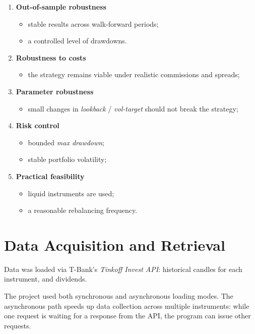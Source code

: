 \documentclass[12pt]{article}
\begin{document}
\begin{enumerate}
    \item \textbf{Out-of-sample robustness}
    \begin{itemize}
        \item stable results across walk-forward periods;
        \item a controlled level of drawdowns.
    \end{itemize}

    \item \textbf{Robustness to costs}
    \begin{itemize}
        \item the strategy remains viable under realistic commissions and spreads;
    \end{itemize}

    \item \textbf{Parameter robustness}
    \begin{itemize}
        \item small changes in \textit{lookback} / \textit{vol-target} should not break the strategy;
    \end{itemize}

    \item \textbf{Risk control}
    \begin{itemize}
        \item bounded \textit{max drawdown};
        \item stable portfolio volatility;
    \end{itemize}

    \item \textbf{Practical feasibility}
    \begin{itemize}
        \item liquid instruments are used;
        \item a reasonable rebalancing frequency.
    \end{itemize}
\end{enumerate}
\section{Data Acquisition and Retrieval}

Data was loaded via T-Bank's \textit{Tinkoff Invest API}: historical candles for each instrument, and dividends.

The project used both synchronous and asynchronous loading modes. The asynchronous path speeds up data collection across multiple instruments: while one request is waiting for a response from the API, the program can issue other requests.
\end{document}
